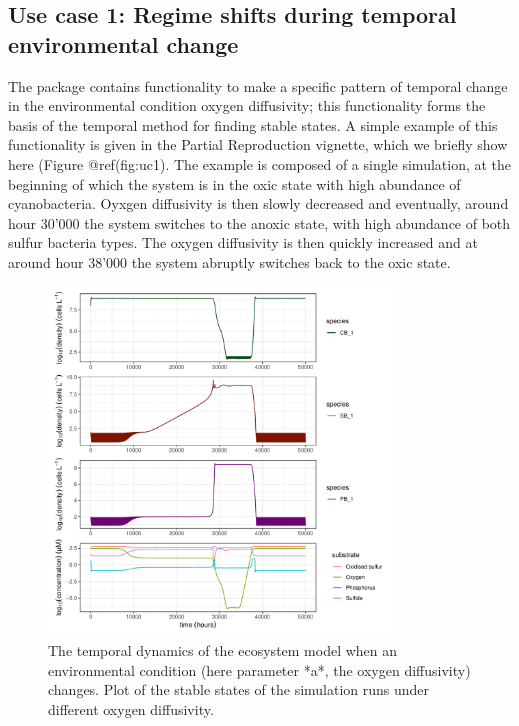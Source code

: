 \documentclass[]{elsarticle} %
\begin{document}
\hypertarget{use-case-1-regime-shifts-during-temporal-environmental-change}{%
\subsection{Use case 1: Regime shifts during temporal environmental
change}\label{use-case-1-regime-shifts-during-temporal-environmental-change}}

The package contains functionality to make a specific pattern of
temporal change in the environmental condition oxygen diffusivity; this
functionality forms the basis of the temporal method for finding stable
states. A simple example of this functionality is given in the Partial
Reproduction vignette, which we briefly show here (Figure @ref(fig:uc1).
The example is composed of a single simulation, at the beginning of
which the system is in the oxic state with high abundance of
cyanobacteria. Oyxgen diffusivity is then slowly decreased and
eventually, around hour 30'000 the system switches to the anoxic state,
with high abundance of both sulfur bacteria types. The oxygen
diffusivity is then quickly increased and at around hour 38'000 the
system abruptly switches back to the oxic state.

\begin{figure}

{\centering \includegraphics[width=350px]{./figures/gen_uc1_partrep_temporal_state_switching} 

}

\caption{The temporal dynamics of the ecosystem model when an environmental condition (here parameter *a*, the oxygen diffusivity) changes. Plot of the stable states of the simulation runs under different oxygen diffusivity.}\label{fig:uc1}
\end{figure}
\end{document}
